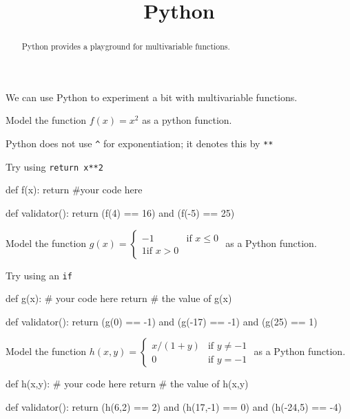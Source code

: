 \documentclass{ximera}
\title{Python}
\begin{document}
\begin{abstract}
  Python provides a playground for multivariable functions.
\end{abstract}

We can use Python to experiment a bit with multivariable functions.

\begin{question}
  \begin{solution}
    Model the function $f(x) = x^2$ as a python function.

    \begin{hint}
    \begin{warning}
      Python does not use \verb|^| for exponentiation; it denotes this by \verb|**|
    \end{warning}
    \end{hint}

    \begin{hint}
      Try using \verb|return x**2|
    \end{hint}
    \begin{python}
def f(x):
  return #your code here

def validator():
  return (f(4) == 16) and (f(-5) == 25)
    \end{python}
  \end{solution}

  \begin{solution}
    Model the function \(g(x)=\begin{cases} -1 & \text{if $x \leq 0$} \\ 1 \text{if $x>0$}\end{cases}\) as a Python function.

    \begin{hint}
      Try using an \verb|if|
    \end{hint}

    \begin{python}
def g(x):
  # your code here
  return # the value of g(x)

def validator():
  return (g(0) == -1) and (g(-17) == -1) and (g(25) == 1)
    \end{python}
  \end{solution}


  \begin{solution}
Model the function \(h(x,y) = \begin{cases} x/(1+y) & \text{if $y \neq -1$} \\ 0 & \text{if $y = -1$}\end{cases}\) as a Python function.

    \begin{python}
def h(x,y):
  # your code here
  return # the value of h(x,y)

def validator():
  return (h(6,2) == 2) and (h(17,-1) == 0) and (h(-24,5) == -4)
    \end{python}
  \end{solution}
\end{question}
	
\end{document}
